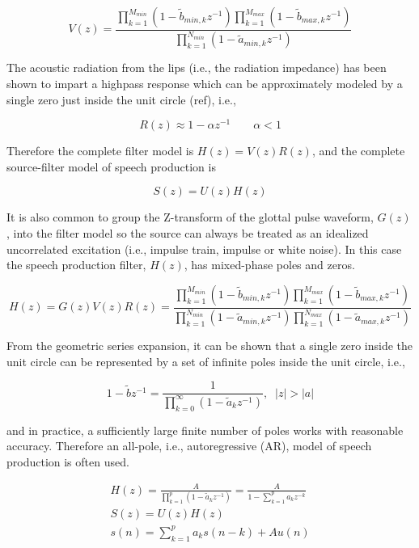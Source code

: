 \[V(z)=
\frac
{\prod_{k=1}^{M_{min}}(1-\tilde{b}_{min,k}z^{-1})
 \prod_{k=1}^{M_{max}}(1-\tilde{b}_{max,k}z^{-1})}
{\prod_{k=1}^{N_{min}}(1-\tilde{a}_{min,k} z^{-1})}
\]

The acoustic radiation from the lips (i.e., the radiation impedance) has been shown to impart a highpass response which can be approximately modeled by a single zero just inside the unit circle (ref), i.e.,

\[R(z)\approx 1-\alpha z^{-1} \qquad \alpha <1\]

Therefore the complete filter model is $H(z)=V(z)R(z)$, and the complete source-filter model of speech production is

\[S(z)=U(z)H(z)\]

It is also common to group the Z-transform of the glottal pulse waveform, $G(z)$, into the filter model so the source can always be treated as an idealized uncorrelated excitation (i.e., impulse train, impulse or white noise). In this case the speech production filter, $H(z)$, has mixed-phase poles and zeros.

\begin{equation}
	H(z) = G(z)V(z)R(z) = 
	\frac
	{\prod_{k=1}^{M_{min}}(1-\tilde{b}_{min,k}z^{-1})
	 \prod_{k=1}^{M_{max}}(1-\tilde{b}_{max,k}z^{-1})}
	{\prod_{k=1}^{N_{min}}(1-\tilde{a}_{min,k} z^{-1})
	 \prod_{k=1}^{N_{max}}(1-\tilde{a}_{max,k} z^{-1})}
\end{equation}

From the geometric series expansion, it can be shown that a single zero inside the unit circle can be represented by a set of infinite poles inside the unit circle, i.e.,

\begin{equation}
	1-\tilde{b}z^{-1} = \frac{1}{\prod_{k=0}^{\infty}(1-\tilde{a}_k z^{-1})}, \;\; |z| > |a| \label{eq:zero_approx}
\end{equation}

\noindent
and in practice, a sufficiently large finite number of poles works with reasonable accuracy. Therefore an all-pole, i.e., autoregressive (AR), model of speech production is often used.

\begin{eqnarray}
	H(z) = \frac{A}{\prod_{k=1}^{p}(1-\tilde{a}_k z^{-1})} = \frac{A}{1 - \sum_{k=1}^{p} a_k z^{-k}}\\
	S(z)=U(z)H(z) \\
	s(n) = \sum_{k=1}^{p}a_k s(n-k) + Au(n) \label{eq:AR_speech}
\end{eqnarray}

